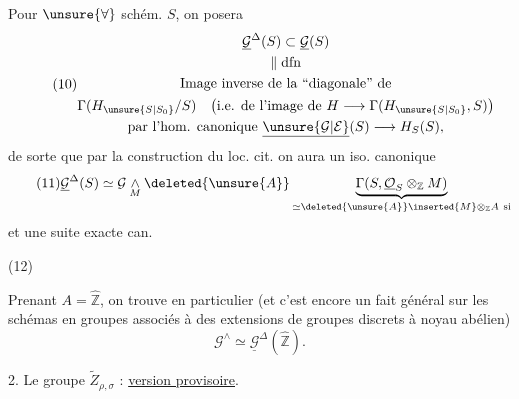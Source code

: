 Pour $\unsure{\forall}$ schém. $S$, on posera
\[
\tag{10}
\begin{gathered}
\underline{\mathcal G}^{\Delta}(S)\subset\underline{\mathcal G}(S)\\
\Vert\;\mathrm{dfn}\\
\text{Image inverse de la ``diagonale'' de}\\
\Gamma(H_{\unsure{S|S_0}}/S)
\quad\bigl(\text{i.e. de l'image de }H\longrightarrow\Gamma(H_{\unsure{S|S_0}},S)\bigr)\\
\text{par l'hom. canonique }\underline{\unsure{\mathcal G|\mathcal E}}(S)\longrightarrow H_S(S),
\end{gathered}
\]
de sorte que par la construction du loc. cit. on aura un iso. canonique
\[
\tag{11}
\underline{\mathcal G}^{\Delta}(S)\simeq
\mathcal G\underset{M}{\wedge}\deleted{\unsure{A}}
\underbrace{\Gamma(S,\underline{\mathcal O}_S\otimes_{\mathbb Z}M)}_{
\simeq\deleted{\unsure{A}}\inserted{M}\otimes_{\mathbb Z}A\ \text{si}}
\]
et une suite exacte can.

(12)\quad{}


Prenant $A=\widehat{\mathbb Z}$, on trouve en particulier (et c'est encore un fait général sur les schémas en groupes associés à des extensions de groupes discrets à noyau abélien)
\[
\tag{13}
\mathcal G^{\wedge}\simeq\underline{\mathcal G}^{\Delta}(\widehat{\mathbb Z}).
\]


2. Le groupe $\widetilde Z_{\rho,\sigma}$ : \uline{version provisoire}.

